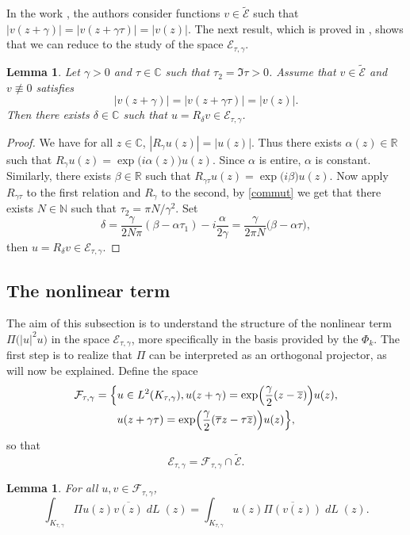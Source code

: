 \documentclass[10pt]{amsart}
\DeclareMathOperator{\dL}{\mathit{dL}}
\newtheorem{lemme}[theorem]{Lemma}
\theoremstyle{definition}
\let\EE\exp
\let\ov\overline
\newcommand\C{\mathbb C}
\newcommand\R{\mathbb R}
\newcommand\N{\mathbb N}
\begin{document}
In the work \cite{ABN}, the authors consider functions $v \in \widetilde{\mathcal{E}}$ such that $| v(z+\gamma)|= | v(z+\gamma\tau)|= |v(z)|$. The next result, which is proved in \cite[\S 3]{Nier2}, shows that we can reduce to the study of the space $\mathcal{E}_{\tau,\gamma}$.

\begin{lemme}\label{lem.transla}
Let $\gamma>0$ and $\tau \in \C$ such that $\tau_2=\Im \tau>0$. Assume that $v \in \widetilde{\mathcal{E}}$ and $v \not \equiv 0$ satisfies
\[
| v(z+\gamma)|= | v(z+\gamma\tau)|= |v(z)|.
\]
Then there exists $\delta \in \C$ such that $u =R_{\delta} v \in \mathcal{E}_{\tau,\gamma}$.
\end{lemme}

\begin{proof}
We have for all $z \in \C$, $|R_{\gamma}u(z)|=|u(z)|$. Thus there exists $\alpha(z)\in \R$ such that $R_{\gamma}u(z)=\EE\bigl(i \alpha(z)\bigr)u(z)$. Since $\alpha$ is entire, $\alpha$ is constant. Similarly, there exists $\beta \in \R$ such that $R_{\gamma \tau}u(z)=\EE\bigl({i \beta}\bigr) u(z)$. Now apply $R_{\gamma \tau}$ to the first relation and $R_{\gamma}$ to the second, by \eqref{commut} we get that there exists $N \in \N$ such that $\tau_2={\pi N}/{\gamma^2}$. Set
\begin{equation}\label{def-d}
\delta=\frac{\gamma}{2N\pi}(\beta-\alpha \tau_1)-i \frac{\alpha}{2 \gamma}=\frac{\gamma}{2\pi N} \bigl(\beta -\alpha \tau\bigr),
\end{equation}
then $u=R_{\delta}v\in \mathcal{E}_{\tau,\gamma}$.
\end{proof}

\subsection{The nonlinear term}

The aim of this subsection is to understand the structure of the nonlinear term $\Pi \bigl(|u|^2 u\bigr)$ in the space $\mathcal{E}_{\tau,\gamma}$, more specifically in the basis provided by the $\Phi_k$. The first step is to realize that $\Pi$ can be interpreted as an orthogonal projector, as will now be explained. Define the space\vspace*{-3pt}
\begin{multline*}
\mathcal{F}_{\tau,\gamma}=\Bigl\{u\in L^2 (K_{\tau,\gamma}), u(z+\gamma)=\EE\Bigl({\frac{\gamma}2(z-\ov{z})}\Bigr) u(z),\\
u(z+\gamma\tau) =\EE\Bigl(\frac{\gamma}2(\ov{\tau}z-\tau\ov{z})\Bigr) u(z)\Bigr\},
\end{multline*}
so that\vspace*{-3pt}
\[
\mathcal{E}_{\tau,\gamma} = \mathcal{F}_{\tau,\gamma} \cap \widetilde{\mathcal{E}}.
\]
\begin{lemme}
\label{lemmaproj}
For all $u,v\in \mathcal{F}_{\tau,\gamma}$,\vspace*{-3pt}
\begin{equation*}
\int_{K_{\tau,\gamma}} \Pi u(z) \ov{v(z)}\dL(z)= \int_{K_{\tau,\gamma}} u(z) \ov{\Pi(v(z))}\dL(z).
\end{equation*}
\end{lemme}
\end{document}
